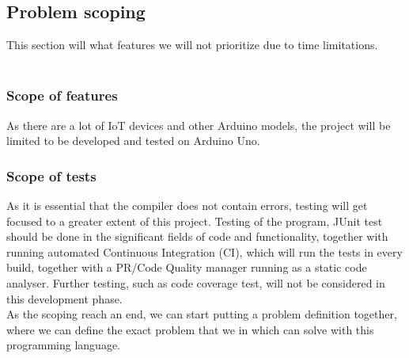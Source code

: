 \subsection{Problem scoping}
This section will what features we will not prioritize due to time limitations.\\

\\
\subsubsection{Scope of features}
As there are a lot of IoT devices and other Arduino models, the project will be limited to be developed and tested on Arduino Uno.

\subsubsection{Scope of tests}
As it is essential that the compiler does not contain errors, testing will get focused to a greater extent of this project. Testing of the program, JUnit test should be done in the significant fields of code and functionality, together with running automated Continuous Integration (CI), which will run the tests in every build, together with a PR/Code Quality manager running as a static code analyser. Further testing, such as code coverage test, will not be considered in this development phase. \\


As the scoping reach an end, we can start putting a problem definition together, where we can define the exact problem that we in which can solve with this programming language.